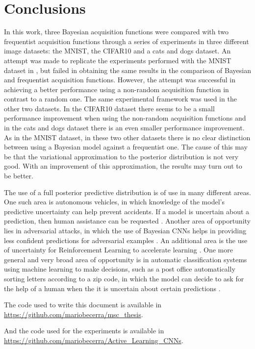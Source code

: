 
\chapter{Conclusions}
\label{ch:conclusions}


In this work, three Bayesian acquisition functions were compared with two frequentist acquisition functions through a series of experiments in three different image datasets: the MNIST, the CIFAR10 and a cats and dogs dataset. An attempt was made to replicate the experiments performed with the MNIST dataset in \cite{Gal2016Active}, but failed in obtaining the same results in the comparison of Bayesian and frequentist acquisition functions. However, the attempt was successful in achieving a better performance using a non-random acquisition function in contrast to a random one. The same experimental framework was used in the other two datasets. In the CIFAR10 dataset there seems to be a small performance improvement when using the non-random acquisition functions and in the cats and dogs dataset there is an even smaller performance improvement. As in the MNIST dataset, in these two other datasets there is no clear distinction between using a Bayesian model against a frequentist one. The cause of this may be that the variational approximation to the posterior distribution is not very good. With an improvement of this approximation, the results may turn out to be better.

The use of a full posterior predictive distribution is of use in many different areas. One such area is autonomous vehicles, in which knowledge of the model's predictive uncertainty can help prevent accidents. If a model is uncertain about a prediction, then human assistance can be requested \cite{gal2016uncertainty, kendall2017uncertainties, michelmore2018evaluating}. Another area of opportunity lies in adversarial attacks, in which the use of Bayesian CNNs helps in providing less confident predictions for adversarial examples \cite{li2017dropout, rawat2017adversarial, smith2018understanding}. An additional area is the use of uncertainty for Reinforcement Learning to accelerate learning \cite{gal2016uncertainty}. One more general and very broad area of opportunity is in automatic classification systems using machine learning to make decisions, such as a post office automatically sorting letters according to a zip code, in which the model can decide to ask for the help of a human when the it is uncertain about certain predictions \cite{gal2016uncertainty}.

The code used to write this document is available in \url{https://github.com/mariobecerra/msc_thesis}.

And the code used for the experiments is available in \url{https://github.com/mariobecerra/Active_Learning_CNNs}.
